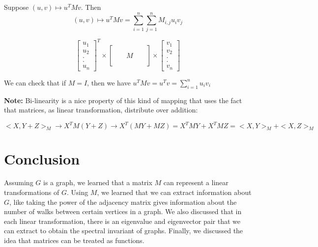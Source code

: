 \documentclass{article}
\begin{document}
Suppose $(u,v) \mapsto u^T M v$. Then $$(u,v) \mapsto u^T M v = \sum_{i=1}^{n} \sum_{j=1}^{n} M_{i,j} u_i v_j$$


$$ \left[ \begin{array}{ccccc}
u_1 \\
u_2 \\
. \\
.\\
u_n
\end{array} \right] ^T
\times  \left[ \begin{array}{ccccc}
 & & & & \\
 & & & & \\
  & & M& & \\
   & & & & \\
    & & & &
\end{array} \right]
%
\times
\left[ \begin{array}{ccccc}
v_1 \\
v_2\\ 
. \\
. \\
v_n
\end{array} \right]
$$

We can check that if $M = I$, then we have $u^T M v = u^T  v =  \sum_{i=1}^{n} u_i v_i$

\textbf{Note:} Bi-linearity is a nice property of this kind of mapping that uses the fact that matrices, as linear transformation, distribute over addition: 

$$<X,Y+Z>_M \rightarrow X^TM(Y+Z) \rightarrow X^T(MY+MZ) = X^TMY + X^TMZ = <X,Y>_M + <X,Z>_M$$

\section{Conclusion}
Assuming $G$ is a graph, we learned that a matrix $M$ can represent a linear transformations of $G$. Using $M$, we learned that we can extract information about $G$, like taking the power of the adjacency matrix gives information about the number of walks between certain vertices in a graph. We also discussed that in each linear transformation, there is an eigenvalue and eigenvector pair that we can extract to obtain the spectral invariant of graphs. Finally, we discussed the idea that matrices can be treated as functions.
\end{document}
